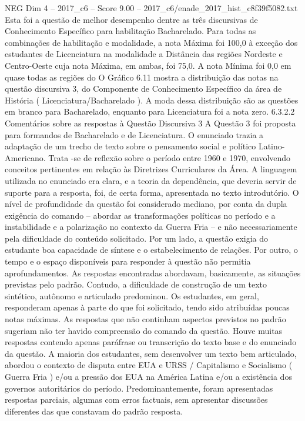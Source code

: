 \begin{textsample}{NEG Dim 4 – 2017\_c6 – Score 9.00 – 2017\_c6/enade\_2017\_hist\_c8f39f5082.txt}
Esta foi a questão de melhor desempenho dentre as três discursivas de Conhecimento Específico para habilitação Bacharelado.
Para todas as combinações de habilitação e modalidade, a nota Máxima foi 100,0 à exceção dos estudantes de Licenciatura na modalidade a Distância das regiões Nordeste e Centro-Oeste cuja nota Máxima, em ambas, foi 75,0.
A nota Mínima foi 0,0 em quase todas as regiões do O Gráfico 6.11 mostra a distribuição das notas na questão discursiva 3, do Componente de Conhecimento Específico da área de História ( Licenciatura/Bacharelado ).
A moda dessa distribuição são as questões em branco para Bacharelado, enquanto para Licenciatura foi a nota zero. 6.3.2.2 Comentários sobre as respostas à Questão Discursiva 3 A Questão 3 foi proposta para formandos de Bacharelado e de Licenciatura.
O enunciado trazia a adaptação de um trecho de texto sobre o pensamento social e político Latino-Americano.
Trata -se de reflexão sobre o período entre 1960 e 1970, envolvendo conceitos pertinentes em relação às Diretrizes Curriculares da Área.
A linguagem utilizada no enunciado era clara, e a teoria da dependência, que deveria servir de suporte para a resposta, foi, de certa forma, apresentada no texto introdutório.
O nível de profundidade da questão foi considerado mediano, por conta da dupla exigência do comando – abordar as transformações políticas no período e a instabilidade e a polarização no contexto da Guerra Fria – e não necessariamente pela dificuldade do conteúdo solicitado.
Por um lado, a questão exigia do estudante boa capacidade de síntese e o estabelecimento de relações.
Por outro, o tempo e o espaço disponíveis para responder à questão não permitia aprofundamentos.
As respostas encontradas abordavam, basicamente, as situações previstas pelo padrão.
Contudo, a dificuldade de construção de um texto sintético, autônomo e articulado predominou.
Os estudantes, em geral, responderam apenas à parte do que foi solicitado, tendo sido atribuídas poucas notas máximas.
As respostas que não continham aspectos previstos no padrão sugeriam não ter havido compreensão do comando da questão.
Houve muitas respostas contendo apenas paráfrase ou transcrição do texto base e do enunciado da questão.
A maioria dos estudantes, sem desenvolver um texto bem articulado, abordou o contexto de disputa entre EUA e URSS / Capitalismo e Socialismo ( Guerra Fria ) e/ou a pressão dos EUA na América Latina e/ou a existência dos governos autoritários do período.
Predominantemente, foram apresentadas respostas parciais, algumas com erros factuais, sem apresentar discussões diferentes das que constavam do padrão resposta.

\end{textsample}
